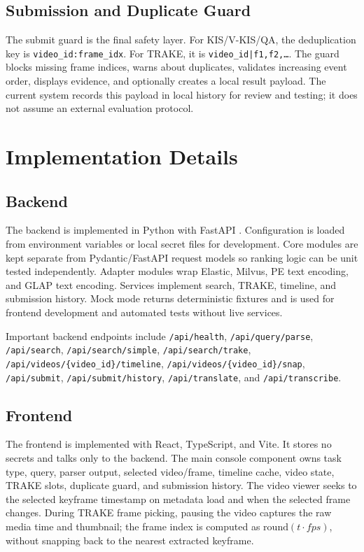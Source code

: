 \documentclass[conference]{IEEEtran}
\begin{document}
\subsection{Submission and Duplicate Guard}

The submit guard is the final safety layer. For KIS/V-KIS/QA, the deduplication
key is \texttt{video\_id:frame\_idx}. For TRAKE, it is
\texttt{video\_id|f1,f2,\ldots}. The guard blocks missing frame indices, warns about
duplicates, validates increasing event order, displays evidence, and optionally
creates a local result payload. The current system records this payload in local
history for review and testing; it does not assume an external evaluation
protocol.

\section{Implementation Details}

\subsection{Backend}

The backend is implemented in Python with FastAPI \cite{fastapi2026}. Configuration is loaded from
environment variables or local secret files for development. Core modules are
kept separate from Pydantic/FastAPI request models so ranking logic can be unit
tested independently. Adapter modules wrap Elastic, Milvus, PE text encoding,
and GLAP text encoding. Services implement search, TRAKE, timeline, and
submission history. Mock mode returns deterministic fixtures and is used for
frontend development and automated tests without live services.

Important backend endpoints include \texttt{/api/health}, \texttt{/api/query/parse},
\texttt{/api/search}, \texttt{/api/search/simple}, \texttt{/api/search/trake},
\texttt{/api/videos/\{video\_id\}/timeline}, \texttt{/api/videos/\{video\_id\}/snap},
\texttt{/api/submit}, \texttt{/api/submit/history}, \texttt{/api/translate}, and
\texttt{/api/transcribe}.

\subsection{Frontend}

The frontend is implemented with React, TypeScript, and Vite. It stores no
secrets and talks only to the backend. The main console component owns task
type, query, parser output, selected video/frame, timeline cache, video state,
TRAKE slots, duplicate guard, and submission history. The video viewer seeks to
the selected keyframe timestamp on metadata load and when the selected frame
changes. During TRAKE frame picking, pausing the video captures the raw media
time and thumbnail; the frame index is computed as $\mathrm{round}(t\cdot fps)$,
without snapping back to the nearest extracted keyframe.
\end{document}
